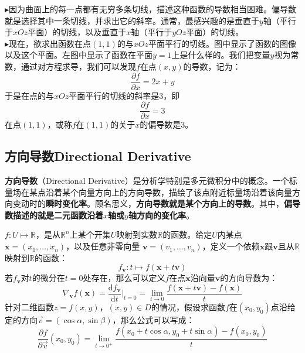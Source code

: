 \documentclass[UTF8]{ctexart}
\begin{document}
{\begin{question}
    $\blacktriangleright$因为曲面上的每一点都有无穷多条切线，描述这种函数的导数相当困难。偏导数就是选择其中一条切线，并求出它的斜率。通常，最感兴趣的是垂直于$y$轴（平行于$xOz$平面）的切线，以及垂直于$x$轴（平行于$yOz$平面）的切线。\\
	$\blacktriangleright$现在，欲求出函数在点$(1,1)$的与$xOz$平面平行的切线。图中显示了函数的图像以及这个平面。左图中显示了函数在平面$y = 1$上是什么样的。我们把变量$y$视为常数，通过对方程求导，我们可以发现$f$在点$(x,y)$的导数，记为：
\begin{equation}
	\frac {\partial f}{\partial x}=2x+y
\end{equation}
于是在点的与$xOz$平面平行的切线的斜率是3，即
\begin{equation}
	\frac {\partial f}{\partial x}=3
\end{equation}
在点$(1, 1)$，或称$f$在$(1, 1)$的关于$x$的偏导数是3。
\end{question}

\subsection{方向导数Directional Derivative}
\textbf{方向导数}（Directional Derivative）是分析学特别是多元微积分中的概念。一个标量场在某点沿着某个向量方向上的方向导数，描绘了该点附近标量场沿着该向量方向变动时的\textbf{瞬时变化率}。顾名思义，\textbf{方向导数就是某个方向上的导数}。其中，\textbf{偏导数描述的就是二元函数沿着$x$轴或$y$轴方向的变化率}。
\begin{question}
$f:U \mapsto \mathbb {R}$，是从$\mathbb {R}^{n}$上某个开集$U$映射到实数$\mathbb {R}$的函数。给定$U$内某点$\mathbf {x} =(x_{1},\ldots ,x_{n})$，以及任意非零向量 $\mathbf {v} =(v_{1},\ldots ,v_{n})$，定义一个依赖$\mathbf {x}$跟$\mathbf {v}$且从$\mathbb {R}$映射到$\mathbb {R}$的函数：
\begin{equation}
	f_{\mathbf {v}} : t \mapsto f(\mathbf {x} +t \mathbf {v})
\end{equation}
若$f_{\mathbf {v}}$对$t$的微分在$t=0$处存在，那么可以定义$f$在点$\mathbf {x}$沿向量$\mathbf {v}$的方向导数为：
\begin{equation}
	\nabla_{\mathbf {v}}{f}(\mathbf {x})=\frac {\mathrm {d} f_{\mathbf {v}}}{\mathrm {d} t}|_{t=0}=\lim _{t\rightarrow 0} \frac {f(\mathbf {x} +t\mathbf {v})-f(\mathbf {x})}{t}
\end{equation}
针对二维函数$z=f(x,y)$，$(x,y)\in D$的情况，假设求函数$f$在$(x_0,y_0)$点沿给定的方向$\vec v = (\cos \alpha , \sin \beta)$，那么公式可以写成：
\begin{equation}
	\frac{\partial f}{\partial \vec v} (x_0, y_0)=\lim_{t \to 0^{+}} \frac{f(x_0 + t \cos \alpha, y_0 + t \sin \alpha) - f(x_0, y_0)}{t}
\end{equation}
\end{question}

}
\end{document}

